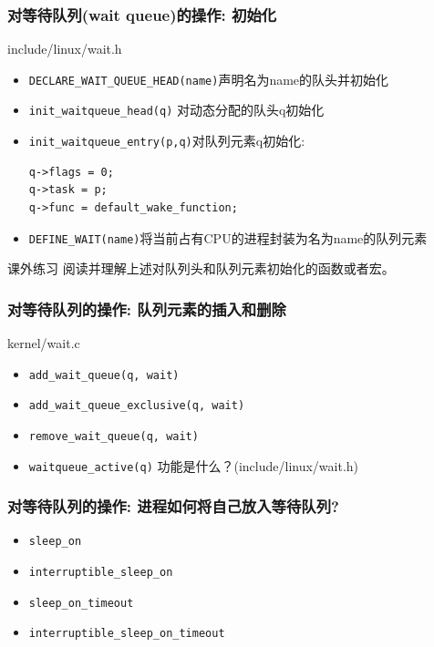 \documentclass[xcolor=svgnames]{beamer}
\begin{document}
\begin{CJK*}{UTF8}{gbsn}
\begin{frame}[fragile]
\frametitle{对等待队列(wait queue)的操作: 初始化}
\begin{block}{include/linux/wait.h}
\begin{itemize}
\item \verb|DECLARE_WAIT_QUEUE_HEAD(name)|声明名为name的队头并初始化
\item \verb|init_waitqueue_head(q)| 对动态分配的队头q初始化
\item \verb|init_waitqueue_entry(p,q)|对队列元素q初始化:
\begin{verbatim}
q->flags = 0;
q->task = p;
q->func = default_wake_function;
\end{verbatim}
\item \verb|DEFINE_WAIT(name)|将当前占有CPU的进程封装为名为name的队列元素
\end{itemize}
\end{block}
\begin{block}{课外练习}
阅读并理解上述对队列头和队列元素初始化的函数或者宏。
\end{block}
\end{frame}

\begin{frame}[fragile]
\frametitle{对等待队列的操作: 队列元素的插入和删除}
\begin{block}{kernel/wait.c}
\begin{itemize}
\item \verb|add_wait_queue(q, wait)|
\item \verb|add_wait_queue_exclusive(q, wait)|
\item \verb|remove_wait_queue(q, wait)|
\item \verb|waitqueue_active(q)| 功能是什么？(include/linux/wait.h)
\end{itemize}
\end{block}
\end{frame}

\begin{frame}[fragile]
\frametitle{对等待队列的操作: 进程如何将自己放入等待队列?}
\begin{itemize}
\item \verb|sleep_on|
\item \verb|interruptible_sleep_on|
\item \verb|sleep_on_timeout|
\item \verb|interruptible_sleep_on_timeout|
\end{itemize}
\end{frame}


\end{CJK*}
\end{document}
